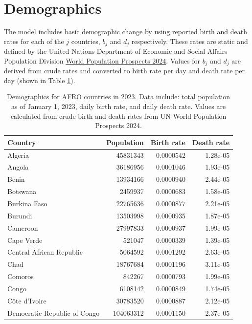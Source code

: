 \documentclass[
]{book}
\begin{document}
\section{Demographics}\label{demographics-1}

The model includes basic demographic change by using reported birth and death rates for each of the \(j\) countries, \(b_j\) and \(d_j\) respectively. These rates are static and defined by the United Nations Department of Economic and Social Affairs Population Division \href{https://population.un.org/wpp/Download/Standard/CSV/}{World Population Prospects 2024}. Values for \(b_j\) and \(d_j\) are derived from crude rates and converted to birth rate per day and death rate per day (shown in Table \ref{tab:demographics}).

\begin{table}
\centering
\caption{\label{tab:demographics}Demographics for AFRO countries in 2023. Data include: total population as of January 1, 2023, daily birth rate, and daily death rate. Values are calculated from crude birth and death rates from UN World Population Prospects 2024.}
\centering
\begin{tabular}[t]{l|r|r|r}
\hline
Country & Population & Birth rate & Death rate\\
\hline
Algeria & 45831343 & 0.0000542 & 1.28e-05\\
\hline
Angola & 36186956 & 0.0001046 & 1.93e-05\\
\hline
Benin & 13934166 & 0.0000940 & 2.44e-05\\
\hline
Botswana & 2459937 & 0.0000683 & 1.58e-05\\
\hline
Burkina Faso & 22765636 & 0.0000877 & 2.21e-05\\
\hline
Burundi & 13503998 & 0.0000935 & 1.87e-05\\
\hline
Cameroon & 27997833 & 0.0000937 & 1.99e-05\\
\hline
Cape Verde & 521047 & 0.0000339 & 1.39e-05\\
\hline
Central African Republic & 5064592 & 0.0001292 & 2.63e-05\\
\hline
Chad & 18767684 & 0.0001196 & 3.11e-05\\
\hline
Comoros & 842267 & 0.0000793 & 1.99e-05\\
\hline
Congo & 6108142 & 0.0000849 & 1.74e-05\\
\hline
Côte d’Ivoire & 30783520 & 0.0000887 & 2.12e-05\\
\hline
Democratic Republic of Congo & 104063312 & 0.0001150 & 2.37e-05\\

\end{tabular}
\end{table}
\end{document}
